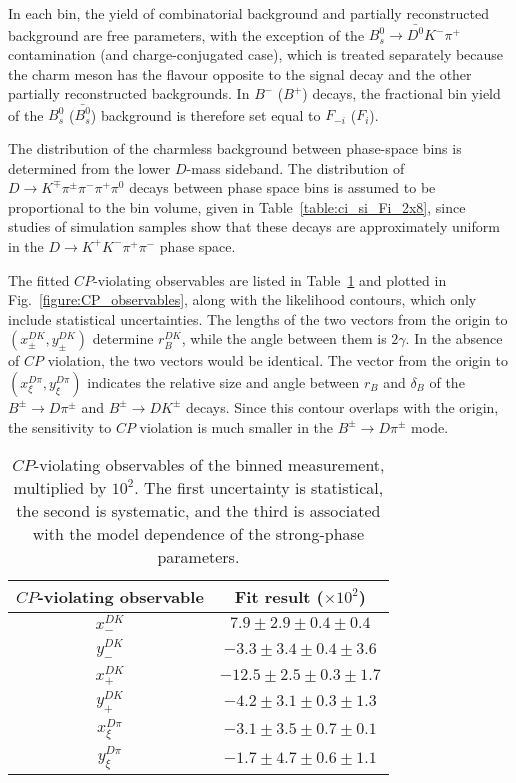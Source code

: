 \documentclass[12pt, a4paper, notitlepage, onecolumn]{article}
\begin{document}
In each bin, the yield of combinatorial background and partially reconstructed background are free parameters, with the exception of the $B^0_s\to\bar{D^0}K^-\pi^+$ contamination (and charge-conjugated case), which is treated separately because the charm meson has the flavour opposite to the signal decay and the other partially reconstructed backgrounds. In $B^-$ ($B^+$) decays, the fractional bin yield of the $B^0_s$ ($\bar{B^0_s}$) background is therefore set equal to $F_{-i}$ ($F_i$).

The distribution of the charmless background between phase-space bins is determined from the lower $D$-mass sideband. The distribution of $D\to K^\mp\pi^\pm\pi^-\pi^+\pi^0$ decays between phase space bins is assumed to be proportional to the bin volume, given in Table~\ref{table:ci_si_Fi_2x8}, since studies of simulation samples show that these decays are approximately uniform in the $D\to K^+K^-\pi^+\pi^-$ phase space.

The fitted $C\!P$-violating observables are listed in Table~\ref{table:GGSZ_observables} and plotted in Fig.~\ref{figure:CP_observables}, along with the likelihood contours, which only include statistical uncertainties. The lengths of the two vectors from the origin to $(x_\pm^{DK}, y_\pm^{DK})$ determine $r_B^{DK}$, while the angle between them is $2\gamma$. In the absence of $C\!P$ violation, the two vectors would be identical. The vector from the origin to $(x_\xi^{D\pi}, y_\xi^{D\pi})$ indicates the relative size and angle between $r_B$ and $\delta_B$ of the $B^\pm\to D\pi^\pm$ and $B^\pm\to DK^\pm$ decays. Since this contour overlaps with the origin, the sensitivity to $C\!P$ violation is much smaller in the $B^\pm\to D\pi^\pm$ mode.

\begin{table}[tb]
    \centering
    \caption{$C\!P$-violating observables of the binned measurement, multiplied by $10^2$.  The first uncertainty is statistical, the second is systematic, and the third is associated with the model dependence of the strong-phase parameters.}
    \label{table:GGSZ_observables}
    \begin{tabular}{cc} 
        \toprule
        $C\!P$-violating observable & Fit result ($\times 10^2$)           \\
        \midrule
        $x_-^{DK}$      & \phantom{+}$7.9 \pm 2.9 \pm 0.4 \pm 0.4$        \\
        $y_-^{DK}$      & $-3.3 \pm 3.4 \pm 0.4 \pm 3.6$       \\
        $x_+^{DK}$      & $-12.5 \pm 2.5 \pm 0.3 \pm 1.7$\phantom{0}      \\
        $y_+^{DK}$      & $-4.2 \pm 3.1 \pm 0.3 \pm 1.3$ \\
        $x_\xi^{D\pi}$    & $-3.1 \pm 3.5 \pm 0.7 \pm 0.1$       \\
        $y_\xi^{D\pi}$    & $-1.7 \pm 4.7 \pm 0.6 \pm 1.1$       \\
        \bottomrule
    \end{tabular}
\end{table}
\end{document}
